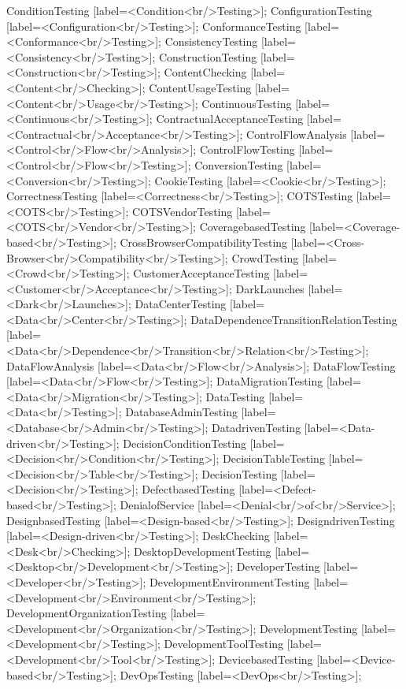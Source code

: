 \documentclass{article}
\begin{document}
{ConditionTesting [label=<Condition<br/>Testing>];
ConfigurationTesting [label=<Configuration<br/>Testing>];
ConformanceTesting [label=<Conformance<br/>Testing>];
ConsistencyTesting [label=<Consistency<br/>Testing>];
ConstructionTesting [label=<Construction<br/>Testing>];
ContentChecking [label=<Content<br/>Checking>];
ContentUsageTesting [label=<Content<br/>Usage<br/>Testing>];
ContinuousTesting [label=<Continuous<br/>Testing>];
ContractualAcceptanceTesting [label=<Contractual<br/>Acceptance<br/>Testing>];
ControlFlowAnalysis [label=<Control<br/>Flow<br/>Analysis>];
ControlFlowTesting [label=<Control<br/>Flow<br/>Testing>];
ConversionTesting [label=<Conversion<br/>Testing>];
CookieTesting [label=<Cookie<br/>Testing>];
CorrectnessTesting [label=<Correctness<br/>Testing>];
COTSTesting [label=<COTS<br/>Testing>];
COTSVendorTesting [label=<COTS<br/>Vendor<br/>Testing>];
CoveragebasedTesting [label=<Coverage-based<br/>Testing>];
CrossBrowserCompatibilityTesting [label=<Cross-Browser<br/>Compatibility<br/>Testing>];
CrowdTesting [label=<Crowd<br/>Testing>];
CustomerAcceptanceTesting [label=<Customer<br/>Acceptance<br/>Testing>];
DarkLaunches [label=<Dark<br/>Launches>];
DataCenterTesting [label=<Data<br/>Center<br/>Testing>];
DataDependenceTransitionRelationTesting [label=<Data<br/>Dependence<br/>Transition<br/>Relation<br/>Testing>];
DataFlowAnalysis [label=<Data<br/>Flow<br/>Analysis>];
DataFlowTesting [label=<Data<br/>Flow<br/>Testing>];
DataMigrationTesting [label=<Data<br/>Migration<br/>Testing>];
DataTesting [label=<Data<br/>Testing>];
DatabaseAdminTesting [label=<Database<br/>Admin<br/>Testing>];
DatadrivenTesting [label=<Data-driven<br/>Testing>];
DecisionConditionTesting [label=<Decision<br/>Condition<br/>Testing>];
DecisionTableTesting [label=<Decision<br/>Table<br/>Testing>];
DecisionTesting [label=<Decision<br/>Testing>];
DefectbasedTesting [label=<Defect-based<br/>Testing>];
DenialofService [label=<Denial<br/>of<br/>Service>];
DesignbasedTesting [label=<Design-based<br/>Testing>];
DesigndrivenTesting [label=<Design-driven<br/>Testing>];
DeskChecking [label=<Desk<br/>Checking>];
DesktopDevelopmentTesting [label=<Desktop<br/>Development<br/>Testing>];
DeveloperTesting [label=<Developer<br/>Testing>];
DevelopmentEnvironmentTesting [label=<Development<br/>Environment<br/>Testing>];
DevelopmentOrganizationTesting [label=<Development<br/>Organization<br/>Testing>];
DevelopmentTesting [label=<Development<br/>Testing>];
DevelopmentToolTesting [label=<Development<br/>Tool<br/>Testing>];
DevicebasedTesting [label=<Device-based<br/>Testing>];
DevOpsTesting [label=<DevOps<br/>Testing>];
}
\end{document}

